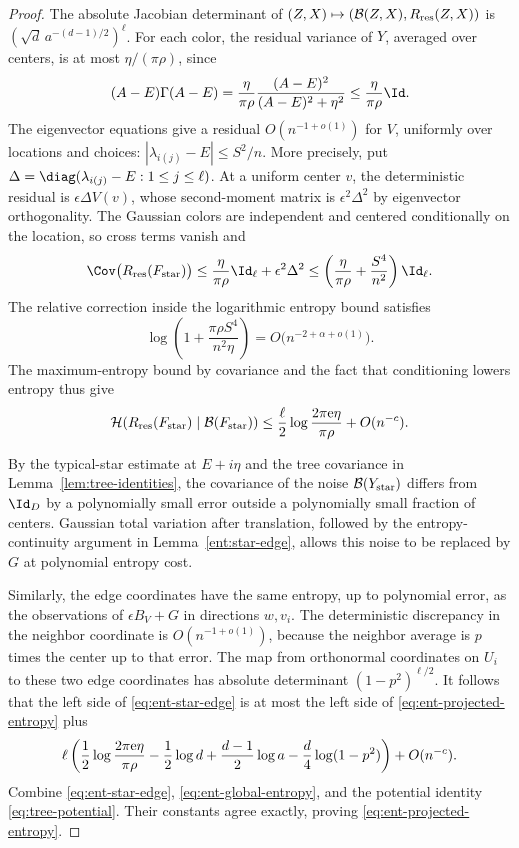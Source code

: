\begin{proof}
The absolute Jacobian determinant of
\((Z,X)\mapsto(\mathcal B(Z,X),R_{\rm res}(Z,X))\) is
\((\sqrt d\,a^{-(d-1)/2})^\ell\).
For each color, the residual variance of \(Y\), averaged over
centers, is at most \(\eta/(\pi\rho)\), since
\[
 (A-E)\Gamma(A-E)
 =\frac{\eta}{\pi\rho}
   \frac{(A-E)^2}{(A-E)^2+\eta^2}
 \le\frac{\eta}{\pi\rho}\Id.
\]
The eigenvector equations give a residual
\(O(n^{-1+o(1)})\) for \(V\), uniformly over locations and choices:
\(|\lambda_{i(j)}-E|\le S^2/n\).
More precisely, put
\(\Delta=\diag(\lambda_{i(j)}-E:1\le j\le\ell)\).
At a uniform center \(v\), the deterministic residual is
\(\epsilon\Delta V(v)\), whose second-moment matrix is
\(\epsilon^2\Delta^2\) by eigenvector orthogonality.
The Gaussian colors are independent and centered conditionally on
the location, so cross terms vanish and
\begin{equation}\label{eq:ent-residual-covariance}
 \Cov\bigl(R_{\rm res}(F_{\rm star})\bigr)
 \le \frac{\eta}{\pi\rho}\Id_\ell+\epsilon^2\Delta^2
 \le \left(\frac{\eta}{\pi\rho}+\frac{S^4}{n^2}\right)\Id_\ell.
\end{equation}
The relative correction inside the logarithmic entropy bound satisfies
\[
 \log\left(1+\frac{\pi\rho S^4}{n^2\eta}\right)
 =O\bigl(n^{-2+\alpha+o(1)}\bigr).
\]
The maximum-entropy bound by covariance and the fact that
conditioning lowers entropy thus give
\[
 \mathcal H(R_{\rm res}(F_{\rm star})\mid
                    \mathcal B(F_{\rm star}))
 \le \frac{\ell}{2}\log\frac{2\pi{\rm e}\eta}{\pi\rho}
          +O(n^{-c}).
\]

By the typical-star estimate at \(E+i\eta\) and the tree covariance
in Lemma~\ref{lem:tree-identities}, the covariance of the noise
\(\mathcal B(Y_{\rm star})\) differs from \(\Id_D\) by a polynomially
small error outside a polynomially small fraction of centers.
Gaussian total variation after translation, followed by the
entropy-continuity argument in Lemma~\ref{ent:star-edge}, allows this
noise to be replaced by \(G\) at polynomial entropy cost.

Similarly, the edge coordinates have the same entropy, up to
polynomial error, as the observations of \(\epsilon B_V+G\)
in directions \(w,v_i\). The deterministic discrepancy in the
neighbor coordinate is \(O(n^{-1+o(1)})\), because the neighbor
average is \(p\) times the center up to that error.
The map from orthonormal coordinates on \(U_i\) to these two
edge coordinates has absolute determinant \((1-p^2)^{\ell/2}\).
It follows that the left side of \eqref{eq:ent-star-edge} is at most
the left side of \eqref{eq:ent-projected-entropy} plus
\[
 \ell\left(
  \frac12\log\frac{2\pi{\rm e}\eta}{\pi\rho}
  -\frac12\log d+\frac{d-1}{2}\log a
                   -\frac d4\log(1-p^2)\right)+O(n^{-c}).
\]
Combine \eqref{eq:ent-star-edge},
\eqref{eq:ent-global-entropy}, and the potential identity
\eqref{eq:tree-potential}. Their constants agree exactly, proving
\eqref{eq:ent-projected-entropy}.


\end{proof}
